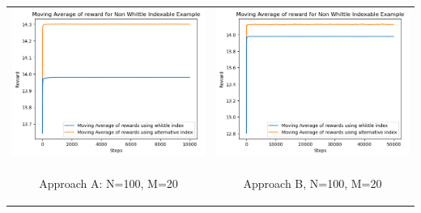 \documentclass{slides}
\begin{document}
{{\newpage
\begin{center}
\begin{tabular}{cc}
\includegraphics[scale=0.6]{non_whittle_comparison_A.png} &
\includegraphics[scale=0.6]{reward_non_whittle.png} \\
\begin{small}
 Approach A: N=100, M=20\end{small} & \begin{small}Approach B, N=100, M=20\end{small}\\

\end{tabular}
\end{center}}}
\end{document}
